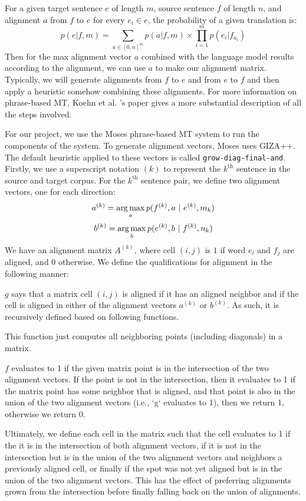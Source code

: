 \documentclass[twocolumn]{article}
\newcommand{\originalAlign}{\texttt{grow-diag-final-and}}
\begin{document}
For a given target sentence $e$ of length $m$, source sentence $f$ of length
$n$, and alignment $a$ from $f$ to $e$ for every $e_i \in e$, the probability of
a given translation is:
\[
  p(e | f, m) = \sum_{a \in [0, n]^m} p(a | f,m)
    \times \prod_{i=1}^m p(e_i | f_{a_i})
\]
Then for the max alignment vector $a$ combined with the language model results
according to the alignment, we can use $a$ to make our alignment
matrix. Typically, we will generate alignments from $f$ to $e$ and from $e$ to
$f$ and then apply a heuristic somehow combining these alignments.
For more information on phrase-based MT, Koehn et al. \cite{kom2003}'s paper
gives a more substantial description of all the steps involved.

For our project, we use the Moses phrase-based MT system to run the components
of the system. To generate alignment vectors, Moses uses GIZA++. The default
heuristic applied to these vectors is called \originalAlign{}.
Firstly, we use a superscript notation $(k)$ to represent the $k^{\text{th}}$
sentence in the source and target corpus.
For the $k^{\text{th}}$ sentence pair, we define two alignment vectors, one for
each direction:
\[ a^{(k)} = \argmax_a p(f^{(k)}, a\ |\ e^{(k)}, m_k) \]
\[ b^{(k)} = \operatorname*{arg\,max}_b p(e^{(k)}, b\ |\ f^{(k)}, n_k) \]
We have an alignment matrix $A^{(k)}$, where cell $(i,j)$ is $1$ if word $e_i$
and $f_j$ are aligned, and $0$ otherwise.
We define the qualifications for alignment in the following manner:

$g$ says that a matrix cell $(i,j)$ is aligned if it has an aligned
neighbor and if the cell is aligned in either of the alignment vectors
$a^{(k)}$ or $b^{(k)}$.
As such, it is recursively defined based on following functions.
\wrapSmall{\isAlignedFromGrow{}}


This function just computes all neighboring points (including diagonals) in a
matrix.
\wrapSmall{\neighborsFunc{}}

$f$ evaluates to 1 if the given matrix point is in the
intersection of the two alignment vectors.
If the point is not in the intersection, then it evaluates to 1
if the matrix point has some neighbor that is aligned, and that point is also
in the union of the two alignment vectors (i.e., `g` evaluates to 1), then
we return 1, otherwise we return 0.
\wrapSmall{\isAlignedFromInterOrGrow{}}

Ultimately, we define each cell in the matrix such that
the cell evaluates to 1 if the it is in the
intersection of both alignment vectors, if it is not in the intersection but is
in the union of the two alignment vectors and neighbors a previously aligned
cell, or finally if the spot was not yet aligned but is in the union of the two
alignment vectors. This has the effect of preferring alignments grown from the
intersection before finally falling back on the union of alignments.
\wrapSmall{\growDiagMatrix{}}
\end{document}
